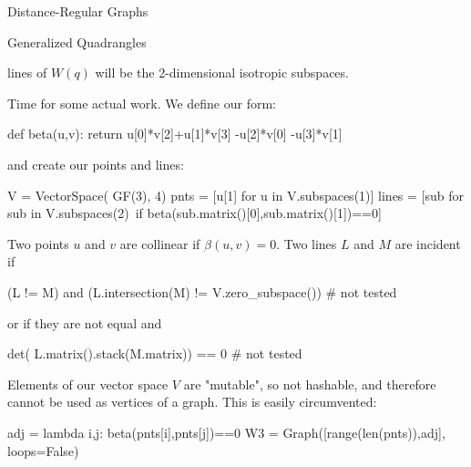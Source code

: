\begin{chap}{Distance-Regular Graphs}
\begin{sect}{Generalized Quadrangles}
\begin{para}
lines of $W(q)$ will be the 2-dimensional isotropic subspaces.
\end{para}
%
\begin{para}
Time for some actual work. We define our form:
\end{para}
%
\begin{sagecode}
\begin{sageinput}
def beta(u,v):
    return u[0]*v[2]+u[1]*v[3] -u[2]*v[0] -u[3]*v[1]
\end{sageinput}
\end{sagecode}
%
\begin{para}
and create our points and lines:
\end{para}
%
\begin{sagecode}
\begin{sageinput}
V = VectorSpace( GF(3), 4)
pnts = [u[1] for u in V.subspaces(1)]
lines = [sub for sub in V.subspaces(2)\
    if beta(sub.matrix()[0],sub.matrix()[1])==0]
\end{sageinput}
\end{sagecode}
%
\begin{para}
Two points $u$ and $v$ are collinear if $\beta(u,v)=0$. Two lines $L$ and $M$ 
are incident if
\end{para}
%
\begin{sagecode}
\begin{sageinput}
(L != M) and (L.intersection(M) != V.zero_subspace()) # not tested
\end{sageinput}
\end{sagecode}
%
\begin{para}
or if they are not equal and
\end{para}
%
\begin{sagecode}
\begin{sageinput}
det( L.matrix().stack(M.matrix)) == 0 # not tested
\end{sageinput}
\end{sagecode}
%
\begin{para}
Elements of our vector space $V$ are "mutable", so not hashable, 
and therefore cannot be used as vertices of a graph. This is easily circumvented:
\end{para}
%
\begin{sagecode}
\begin{sageinput}
adj = lambda i,j: beta(pnts[i],pnts[j])==0
W3 = Graph([range(len(pnts)),adj], loops=False)
\end{sageinput}
\end{sagecode}
%
\begin{para}

\end{para}
\end{sect}
\end{chap}
